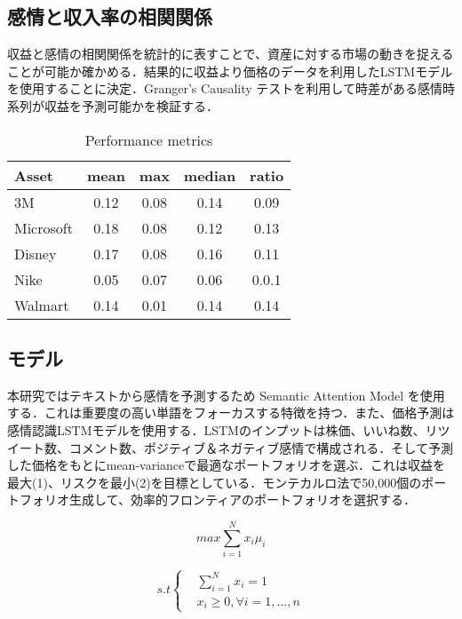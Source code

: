 \documentclass[submit,techrep,noauthor]{ipsj}
\begin{document}
\subsection{感情と収入率の相関関係}
収益と感情の相関関係を統計的に表すことで、資産に対する市場の動きを捉えることが可能か確かめる．結果的に収益より価格のデータを利用したLSTMモデルを使用することに決定．Granger’s Causality テストを利用して時差がある感情時系列が収益を予測可能かを検証する．
\begin{table}[htb] %
\caption{Performance metrics} %
\label{release} %
\begin{center}
\begin{tabular}{| l | c | c  | c | c |} \hline %
Asset & mean & max & median & ratio  \\ \hline %
3M & 0.12 & 0.08 & 0.14 & 0.09 \\ 
Microsoft &0.18 & 0.08& 0.12 &  0.13 \\
Disney  &0.17 &   0.08 & 0.16 &  0.11\\
Nike   & 0.05& 0.07 & 0.06 &  0.0.1\\
Walmart  &0.14 &0.01 & 0.14 &  0.14\\ \hline
\end{tabular}
\end{center}
\end{table}

\subsection{モデル}
本研究ではテキストから感情を予測するため Semantic Attention Model \cite{third}を使用する．これは重要度の高い単語をフォーカスする特徴を持つ．また、価格予測は感情認識LSTMモデルを使用する．LSTMのインプットは株価、いいね数、リツイート数、コメント数、ポジティブ＆ネガティブ感情で構成される．そして予測した価格をもとにmean-varianceで最適なポートフォリオを選ぶ．これは収益を最大(1)、リスクを最小(2)を目標としている．モンテカルロ法で50,000個のポートフォリオ生成して、効率的フロンティアのポートフォリオを選択する．


\begin{equation}
  max\sum_{i=1}^N x_i \mu_i
\end{equation}

\begin{equation}
  	s.t\left\{
		\begin{alignedat}{2} 
		& \sum_{i=1}^N x_i = 1\\
		& x_i  \ge 0, \forall i  = 1, \dots , n
		\end{alignedat} 
	\right.
\end{equation}
\end{document}
